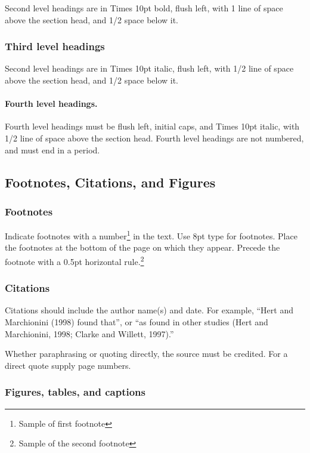 \documentclass{article} \usepackage{proceed}
\begin{document}
Second level headings are in Times 10pt bold, flush left, with 1
line of space above the section head, and 1/2 space below it.

\subsubsection{Third level headings}

Second level headings are in Times 10pt italic, flush left, with
1/2 line of space above the section head, and 1/2 space below it.

\paragraph{Fourth level headings.}

Fourth level headings must be flush left, initial caps, and Times
10pt italic, with 1/2 line of space above the section head.
Fourth level headings are not numbered, and must end in a period.

\subsection{Footnotes, Citations, and Figures}

\subsubsection{Footnotes}

Indicate footnotes with a number\footnote{Sample of first footnote} in
the text.  Use 8pt type for footnotes.  Place the footnotes at the
bottom of the page on which they appear.  Precede the footnote with a
0.5pt horizontal rule.\footnote{Sample of the second
footnote}

\subsubsection{Citations}

Citations should include the author name(s) and date.  For example,
``Hert and Marchionini (1998) found that'', or ``as found in other
studies (Hert and Marchionini, 1998; Clarke and Willett, 1997).''

Whether paraphrasing or quoting directly, the source must be
credited. For a direct quote supply page numbers.

\subsubsection{Figures, tables, and captions}
\end{document}
